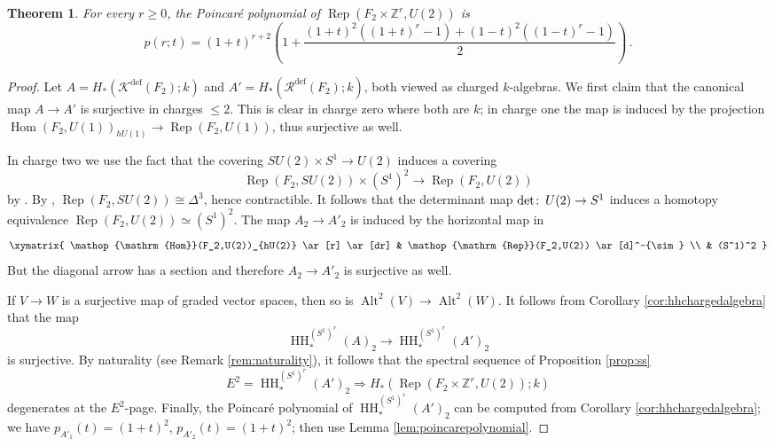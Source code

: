 \documentclass[oneside, a4paper, 12pt]{article}
\numberwithin{equation}{section}
\DeclareMathOperator{\Rep}{Rep}
\DeclareMathOperator{\Hom}{Hom}
\DeclareMathOperator{\HH}{HH}
\DeclareMathOperator{\Alt}{Alt}
\newcommand{\Kdef}{\mathcal{K}^{\mathrm{def}}}
\newcommand{\Rdef}{\mathcal{R}^{\mathrm{def}}}
\newcommand{\Z}{\mathbb{Z}}
\newcommand{\co}{\colon\thinspace}
\theoremstyle{plain}
\newtheorem{theorem}{Theorem}[section]
\theoremstyle{definition}
\theoremstyle{remark}
\begin{document}
\begin{theorem} \label{thm:poincarerep}
For every $r\geq 0$, the Poincar{\'e} polynomial of $\Rep(F_2\times \Z^r,U(2))$ is
\[
p(r;t)=(1+t)^{r+2}\left(1+\frac{(1+t)^2((1+t)^r-1)+(1-t)^2((1-t)^r-1)}{2}\right)\, .
\]
\end{theorem}
\begin{proof}
Let $A=H_\ast(\Kdef(F_2);k)$ and $A'=H_\ast(\Rdef(F_2);k)$, both viewed as charged $k$-algebras. We first claim that the canonical map $A\to A'$ is surjective in charges $\leq 2$. This is clear in charge zero where both are $k$; in charge one the map is induced by the projection $\Hom(F_2,U(1))_{hU(1)}\to \Rep(F_2,U(1))$, thus surjective as well.

In charge two we use the fact that the covering $SU(2)\times S^1\to U(2)$ induces a covering
\[
\Rep(F_2,SU(2))\times (S^1)^2 \to \Rep(F_2,U(2))
\]
by \cite[Theorem A]{Lawton}. By \cite[Theorem 6.5]{Florentino}, $\Rep(F_2,SU(2))\cong \Delta^3$, hence contractible. It follows that the determinant map $\mathrm{det}\co U(2)\to S^1$ induces a homotopy equivalence $\Rep(F_2,U(2))\simeq (S^1)^2$. The map $A_2\to A'_2$ is induced by the horizontal map in
\[
\xymatrix{
\Hom(F_2,U(2))_{hU(2)} \ar[r] \ar[dr] & \Rep(F_2,U(2)) \ar[d]^-{\sim} \\
& (S^1)^2
}
\]
But the diagonal arrow has a section and therefore $A_2\to A'_2$ is surjective as well.

If $V\to W$ is a surjective map of graded vector spaces, then so is $\Alt^2(V)\to \Alt^2(W)$. It follows from Corollary \ref{cor:hhchargedalgebra} that the map
\[
\HH_\ast^{(S^1)^r}(A)_2\to \HH_\ast^{(S^1)^r}(A')_2
\]
is surjective. By naturality (see Remark \ref{rem:naturality}), it follows that the spectral sequence of Proposition \ref{prop:ss} 
\[
E^2=\HH^{(S^1)^r}_\ast(A')_{2} \Longrightarrow H_\ast(\Rep(F_2\times \Z^r,U(2));k)
\]
degenerates at the $E^2$-page. Finally, the Poincar{\'e} polynomial of $\HH^{(S^1)^r}_\ast(A')_{2}$ can be computed from Corollary \ref{cor:hhchargedalgebra}; we have $p_{A'_1}(t)=(1+t)^2$, $p_{A'_2}(t)=(1+t)^2$; then use Lemma \ref{lem:poincarepolynomial}.
\end{proof}


\end{document}
